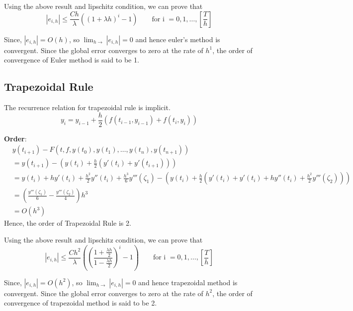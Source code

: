 \documentclass{article}
\begin{document}
		Using the above result and lipschitz condition, we can prove that 
		\[|e_{i,h}| \leq \frac{Ch}{\lambda}((1+\lambda h)^i -1) \qquad \text{for i } = 0,1,\hdots,[\frac{T}{h}] \]

		Since, $|e_{i,h}| = O(h)$, so $\lim_{h\rightarrow} |e_{i,h}| =0$ and hence euler's method is convergent. Since the global error converges to zero at the rate of $h^1$, the order of convergence of Euler method is said to be 1.

	\subsection{Trapezoidal Rule}
		The recurrence relation for trapezoidal rule is implicit.
		\[y_i = y_{i-1} + \frac{h}{2} (f(t_{i-1}, y_{i-1})+ f(t_i, y_i)) \]

		\textbf{Order}:
		\begin{align*}
			&y(t_{i+1}) - F(t,f,y(t_0), y(t_1), \hdots, y(t_n),y(t_{n+1})) \\
			&= y(t_{i+1}) - (y(t_i) + \frac{h}{2} (y'(t_i)+ y'(t_{i+1})))\\
			&= y(t_i)+hy'(t_i)+\frac{h^2}{2}y''(t_i) + \frac{h^3}{6} y'''(\zeta_1) - (y(t_i)+ \frac{h}{2}(y'(t_i) + y'(t_i) + h y''(t_i) + \frac{h^2}{2} y'''(\zeta_2)))\\
			&= (\frac{y'''(\zeta_1)}{6} - \frac{y'''(\zeta_2)}{4})h^3\\
			&= O(h^3)
		\end{align*}
		Hence, the order of Trapezoidal Rule is 2.

		Using the above result and lipschitz condition, we can prove that
		\[|e_{i,h}| \leq \frac{Ch^2}{\lambda} \left( \left( \frac{1 + \frac{\lambda h}{2}}{1 - \frac{\lambda h}{2}}\right)^i -1 \right) \qquad \text{for i } = 0,1,\hdots, [\frac{T}{h}]\]

		Since, $|e_{i,h}| = O(h^2)$, so $\lim_{h\rightarrow} |e_{i,h}| =0$ and hence trapezoidal method is convergent. Since the global error converges to zero at the rate of $h^2$, the order of convergence of trapezoidal method is said to be 2.



\pagebreak
\end{document}
